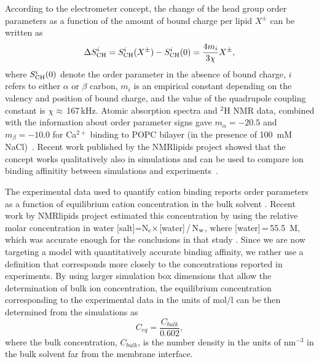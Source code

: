 \documentclass[aip,jcp,twocolumn]{revtex4}
\begin{document}
According to the electrometer concept,
the change of the head group order parameters as a function of
the amount of bound charge per lipid $X^\pm$ 
can be written as~\cite{ferreira16}
\begin{equation}\label{OPchangeEQ}
\Delta S_{\rm{CH}}^{i}= S_{\rm{CH}}^{i}(X^\pm)-S_{\rm{CH}}^{i}(0) =\frac{4m_i }{3\chi}X^\pm,
\end{equation}
where $S_{\rm{CH}}^{i}(0)$ denote the order parameter in the absence of bound charge,
$i$ refers to either $\alpha$ or $\beta$ carbon,
$m_i$ is an empirical constant depending on the valency and position of bound charge,
and the value of the quadrupole coupling constant is $\chi \approx$\,167\,kHz.
Atomic absorption spectra and $^2$H NMR data, combined with the
information about order parameter signs gave
$m_\alpha=-20.5$  and $m_\beta=-10.0$ for Ca$^{2+}$ binding to POPC
bilayer (in the presence of 100~mM NaCl)~\cite{altenbach84,ollila16,catte16}.
Recent work published by the NMRlipids project showed that the concept works
qualitatively also in simulations and can be used to compare ion binding
affinitity between simulations and experiments~\cite{catte16}.

The experimental data used to quantify cation binding reports
order parameters as a function of equilibrium cation concentration
in the bulk solvent \cite{akutsu81,altenbach84}. Recent work
by NMRlipids project estimated this concentration by using
the relative molar concentration in water
[salt]=N$_{\rm c} \times$[water]\,/\,N$_{\rm w}$, where [water]\,=\,55.5~M,
which was accurate enough for the conclusions in that study \cite{catte16}.
Since we are now targeting a model with quantitatively accurate binding
affinity, we rather use a definition that corresponds more closely to the 
concentrations reported in experiments. 
By using larger simulation box dimensions that allow the
determination of bulk ion concentration, the equilibrium concentration
corresponding to the experimental data in the units of $\mathrm{mol/l}$
can be then determined from the simulations as
\begin{equation}
\label{eq:conc}
  C_{eq}=\frac{C_{bulk}}{0.602},
\end{equation}
where the bulk concentration, $C_{bulk}$, is the number density in the units of $\mathrm{nm}^{-3}$
in the bulk solvent far from the membrane interface. 
\end{document}
